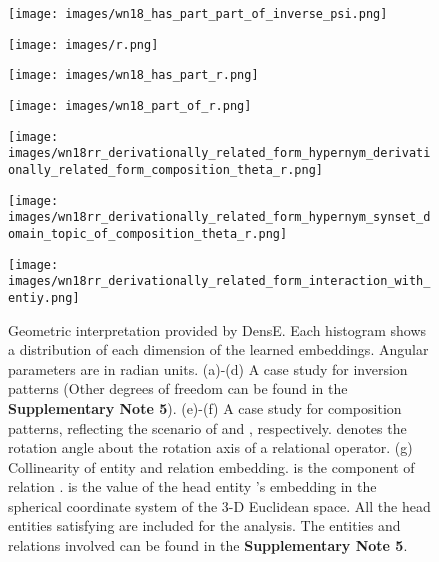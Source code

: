 \documentclass[11pt]{article}
\begin{document}
\begin{figure*}[!ht]
\centering

\begin{minipage}{3.2cm}
\centering
\texttt{[image: images/wn18\_has\_part\_part\_of\_inverse\_psi.png]}
\subcaption{\scriptsize{}}
\end{minipage}
\begin{minipage}{3.2cm}
\centering
\texttt{[image: images/r.png]}
\subcaption{\scriptsize{}}
\end{minipage}
\begin{minipage}{3.2cm}
\centering
\texttt{[image: images/wn18\_has\_part\_r.png]}
\subcaption{\scriptsize{}}
\end{minipage}\begin{minipage}{3.2cm}
\centering
\texttt{[image: images/wn18\_part\_of\_r.png]}
\subcaption{\scriptsize{}}
\end{minipage}

\begin{minipage}{4cm}
\centering
\texttt{[image: images/wn18rr\_derivationally\_related\_form\_hypernym\_derivationally\_related\_form\_composition\_theta\_r.png]}
\subcaption{\scriptsize{}}
\end{minipage}\hspace{0.5cm}
\begin{minipage}{4cm}
\centering
\texttt{[image: images/wn18rr\_derivationally\_related\_form\_hypernym\_synset\_domain\_topic\_of\_composition\_theta\_r.png]}
\subcaption{\scriptsize{}}
\end{minipage}
\hspace{0.5cm}
\begin{minipage}{4cm}
\centering
\texttt{[image: images/wn18rr\_derivationally\_related\_form\_interaction\_with\_entiy.png]}
\subcaption{\scriptsize{}}
\end{minipage}

\hspace{0.5cm}
\caption{Geometric interpretation provided by DensE. Each histogram shows a distribution of each dimension of the learned embeddings. Angular parameters are in radian units. (a)-(d) A case study for inversion patterns (Other degrees of freedom can be found in the \textbf{Supplementary Note 5}). (e)-(f) A case study for composition patterns, reflecting the scenario of  and , respectively.  denotes the rotation angle about the rotation axis of a relational operator. (g) Collinearity of entity and relation embedding.  is the  component of relation .  is the  value of the head entity 's embedding in the spherical coordinate system of the 3-D Euclidean space. All the head entities satisfying  are included for the analysis.  The entities and relations involved can be found in the \textbf{Supplementary Note 5}.}
\label{Fig:Geo}
\end{figure*}
\end{document}
